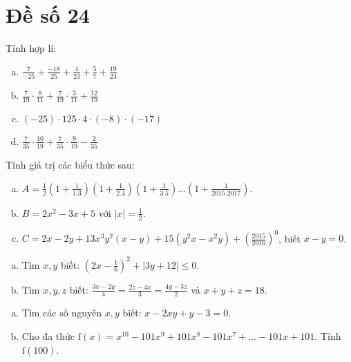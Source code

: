 \onehalfspacing
\section{Đề số 24}
\graphicspath{{./img/}}
\begin{bt} 
    Tính hợp lí:
   \begin{enumerate}[a.]
    \item $\frac{7}{-25}+\frac{-18}{25}+\frac{4}{23}+\frac{5}{7}+\frac{19}{23}$
    \item $\frac{7}{19} \cdot \frac{8}{11}+\frac{7}{19} \cdot \frac{3}{11}+\frac{12}{19}$
    \item $(-25) \cdot 125 \cdot 4 \cdot(-8) \cdot(-17)$ 
    \item $\frac{7}{35} \cdot \frac{10}{19}+\frac{7}{35} \cdot \frac{9}{19}-\frac{2}{35}$
   \end{enumerate}
\loigiai{}
\end{bt}

\begin{bt}
    Tính giá trị các biểu thức sau:
	\begin{enumerate}[a.]
        \item $A=\frac{1}{2}\left(1+\frac{1}{1.3}\right)\left(1+\frac{1}{2.4}\right)\left(1+\frac{1}{3.5}\right) ... \left(1+\frac{1}{2015.2017}\right)$.
        \item $B=2 x^2-3 x+5$ với $|x|=\frac{1}{2}$.
        \item $C=2 x-2 y+13 x^3 y^2(x-y)+15\left(y^2 x-x^2 y\right)+\left(\frac{2015}{2016}\right)^0$, biết $x-y=0$.
    \end{enumerate}
	\loigiai{} 
\end{bt}

\begin{bt}
    \hfill
    \begin{enumerate}[a.]
        \item Tìm $x, y$ biết: $\left(2 x-\frac{1}{6}\right)^2+|3 y+12| \leq 0$.
        \item Tìm $x, y, z$ biết: $\frac{3 x-2 y}{4}=\frac{2 z-4 x}{3}=\frac{4 y-3 z}{2}$ và $x+y+z=18$.
    \end{enumerate}
	\loigiai{}
\end{bt}

\begin{bt}
    \hfill
    \begin{enumerate}[a.]
        \item Tìm các số nguyên $x, y$ biết: $x-2 x y+y-3=0$.
        \item Cho đa thức $\mathrm{f}(x)=x^{10}-101 x^9+101 x^8-101 x^7+\ldots-101 x+101$. Tính $\mathrm{f}(100)$.
    \end{enumerate}
	\loigiai{}
\end{bt}

